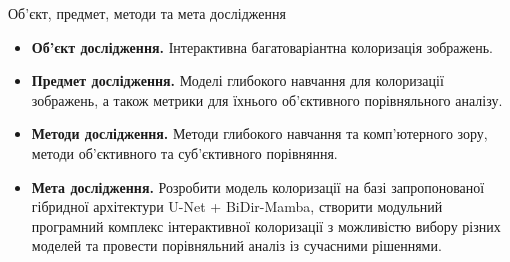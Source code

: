 \begin{frame}{Об'єкт, предмет, методи та мета дослідження}
    \begin{itemize}
        \item \textbf{Об'єкт дослідження.}
            Інтерактивна багатоваріантна колоризація зображень.

        \item \textbf{Предмет дослідження.}
            Моделі глибокого навчання для колоризації зображень,
            а також метрики для їхнього об'єктивного порівняльного аналізу.

        \item \textbf{Методи дослідження.}
            Методи глибокого навчання та комп'ютерного зору,
            методи об'єктивного та суб'єктивного порівняння.

        \item \textbf{Мета дослідження.}
            Розробити модель колоризації на базі запропонованої гібридної архітектури U-Net + BiDir-Mamba,
            створити модульний програмний комплекс інтерактивної колоризації з можливістю вибору різних моделей
            та провести порівняльний аналіз із сучасними рішеннями.
    \end{itemize}
\end{frame}


    	
